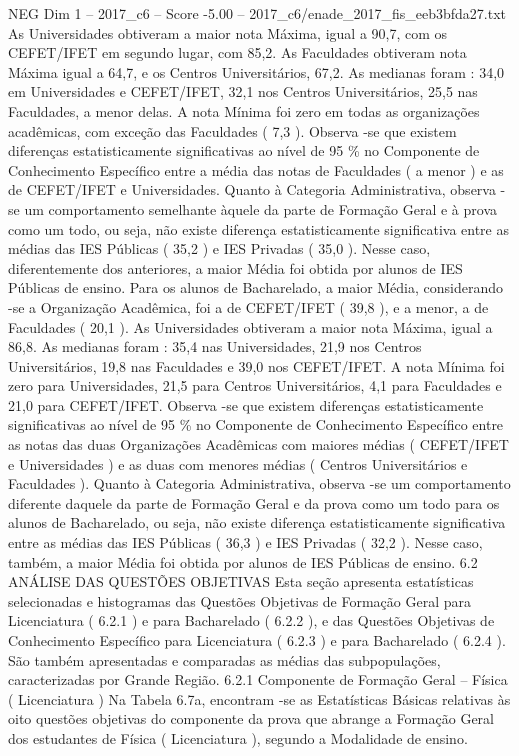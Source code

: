 \begin{textsample}{NEG Dim 1 – 2017\_c6 – Score -5.00 – 2017\_c6/enade\_2017\_fis\_eeb3bfda27.txt}
As Universidades obtiveram a maior nota Máxima, igual a 90,7, com os CEFET/IFET em segundo lugar, com 85,2.
As Faculdades obtiveram nota Máxima igual a 64,7, e os Centros Universitários, 67,2.
As medianas foram : 34,0 em Universidades e CEFET/IFET, 32,1 nos Centros Universitários, 25,5 nas Faculdades, a menor delas.
A nota Mínima foi zero em todas as organizações acadêmicas, com exceção das Faculdades ( 7,3 ).
Observa -se que existem diferenças estatisticamente significativas ao nível de 95 \% no Componente de Conhecimento Específico entre a média das notas de Faculdades ( a menor ) e as de CEFET/IFET e Universidades.
Quanto à Categoria Administrativa, observa -se um comportamento semelhante àquele da parte de Formação Geral e à prova como um todo, ou seja, não existe diferença estatisticamente significativa entre as médias das IES Públicas ( 35,2 ) e IES Privadas ( 35,0 ).
Nesse caso, diferentemente dos anteriores, a maior Média foi obtida por alunos de IES Públicas de ensino.
Para os alunos de Bacharelado, a maior Média, considerando -se a Organização Acadêmica, foi a de CEFET/IFET ( 39,8 ), e a menor, a de Faculdades ( 20,1 ).
As Universidades obtiveram a maior nota Máxima, igual a 86,8.
As medianas foram : 35,4 nas Universidades, 21,9 nos Centros Universitários, 19,8 nas Faculdades e 39,0 nos CEFET/IFET.
A nota Mínima foi zero para Universidades, 21,5 para Centros Universitários, 4,1 para Faculdades e 21,0 para CEFET/IFET.
Observa -se que existem diferenças estatisticamente significativas ao nível de 95 \% no Componente de Conhecimento Específico entre as notas das duas Organizações Acadêmicas com maiores médias ( CEFET/IFET e Universidades ) e as duas com menores médias ( Centros Universitários e Faculdades ).
Quanto à Categoria Administrativa, observa -se um comportamento diferente daquele da parte de Formação Geral e da prova como um todo para os alunos de Bacharelado, ou seja, não existe diferença estatisticamente significativa entre as médias das IES Públicas ( 36,3 ) e IES Privadas ( 32,2 ).
Nesse caso, também, a maior Média foi obtida por alunos de IES Públicas de ensino. 6.2 ANÁLISE DAS QUESTÕES OBJETIVAS Esta seção apresenta estatísticas selecionadas e histogramas das Questões Objetivas de Formação Geral para Licenciatura ( 6.2.1 ) e para Bacharelado ( 6.2.2 ), e das Questões Objetivas de Conhecimento Específico para Licenciatura ( 6.2.3 ) e para Bacharelado ( 6.2.4 ).
São também apresentadas e comparadas as médias das subpopulações, caracterizadas por Grande Região. 6.2.1 Componente de Formação Geral – Física ( Licenciatura ) Na Tabela 6.7a, encontram -se as Estatísticas Básicas relativas às oito questões objetivas do componente da prova que abrange a Formação Geral dos estudantes de Física ( Licenciatura ), segundo a Modalidade de ensino.

\end{textsample}
